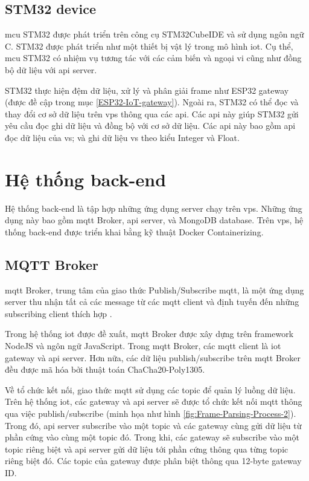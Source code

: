 \subsection{STM32 device}

\acrshort{mcu} STM32 được phát triển trên công cụ STM32CubeIDE và sử dụng ngôn ngữ C. STM32 được phát triển như một thiết bị vật lý trong mô hình \acrshort{iot}. Cụ thể, \acrshort{mcu} STM32 có nhiệm vụ tương tác với các cảm biến và ngoại vi cũng như đồng bộ dữ liệu với \acrshort{api} server.

STM32 thực hiện đệm dữ liệu, xử lý và phân giải frame như ESP32 gateway (được đề cập trong mục \ref{ESP32-IoT-gateway}). Ngoài ra, STM32 có thể đọc và thay đổi cơ sở dữ liệu trên \acrshort{vps} thông qua các \acrshort{api}. Các \acrshort{api} này giúp STM32 gửi yêu cầu đọc ghi dữ liệu và đồng bộ với cơ sở dữ liệu. Các \acrshort{api} này bao gồm \acrshort{api} đọc dữ liệu của \acrfull{vs}; và ghi dữ liệu \acrshort{vs} theo kiểu Integer và Float.

\section{Hệ thống back-end}

Hệ thống back-end là tập hợp những ứng dụng server chạy trên \acrshort{vps}. Những ứng dụng này bao gồm \acrshort{mqtt} Broker, \acrshort{api} server, và MongoDB database. Trên \acrshort{vps}, hệ thống back-end được triển khai bằng kỹ thuật Docker Containerizing.

\subsection{MQTT Broker}

\acrshort{mqtt} Broker, trung tâm của giao thức Publish/Subscribe \acrshort{mqtt}, là một ứng dụng server thu nhận tất cả các message từ các \acrshort{mqtt} client và định tuyến đến những subscribing client thích hợp \cite{MQTT-Broker-Def}.

Trong hệ thống \acrshort{iot} được đề xuất, \acrshort{mqtt} Broker được xây dựng trên framework NodeJS và ngôn ngữ JavaScript. Trong \acrshort{mqtt} Broker, các \acrshort{mqtt} client là \acrshort{iot} gateway và \acrshort{api} server. Hơn nữa, các dữ liệu publish/subscribe trên \acrshort{mqtt} Broker đều được mã hóa bởi thuật toán ChaCha20-Poly1305.

Về tổ chức kết nối, giao thức \acrshort{mqtt} sử dụng các topic để quản lý luồng dữ liệu. Trên hệ thống \acrshort{iot}, các gateway và \acrshort{api} server sẽ được tổ chức kết nối \acrshort{mqtt} thông qua việc publish/subscribe (minh họa như hình \ref{fig:Frame-Parsing-Process-2}). Trong đó, \acrshort{api} server subscribe vào một topic và các gateway cùng gửi dữ liệu từ phần cứng vào cùng một topic đó. Trong khi, các gateway sẽ subscribe vào một topic riêng biệt và \acrshort{api} server gửi dữ liệu tới phần cứng thông qua từng topic riêng biệt đó. Các topic của gateway được phân biệt thông qua 12-byte gateway ID.

